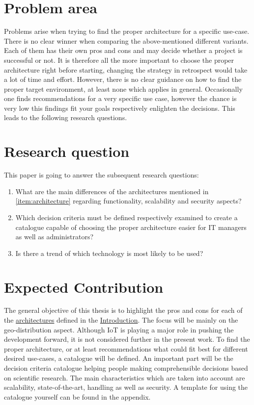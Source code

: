 \documentclass[MIC,Master,english]{twbook}%
\begin{document}
\section{Problem area}
Problems arise when trying to find the proper architecture for a specific use-case. There is no clear winner when comparing the above-mentioned different variants. Each of them has their own pros and cons and may decide whether a project is successful or not. It is therefore all the more important to choose the proper architecture right before starting, changing the strategy in retrospect would take a lot of time and effort. However, there is no clear guidance on how to find the proper target environment, at least none which applies in general. Occasionally one finds recommendations for a very specific use case, however the chance is very low this findings fit your goals respectively enlighten the decisions. This leads to the following research questions.

\section{Research question}
\label{sec:rq}
This paper is going to answer the subsequent research questions:
\begin{enumerate}
    \item What are the main differences of the architectures mentioned in \autoref{item:architecture} regarding functionality, scalability and security aspects?
    \item Which decision criteria must be defined respectively examined to create a catalogue capable
    of choosing the proper architecture easier for \ac{IT} managers as well as administrators?
    \item Is there a trend of which technology is most likely to be used?
\end{enumerate}

\section{Expected Contribution}
\label{sec:goal}
The general objective of this thesis is to highlight the pros and cons for each of the \hyperref[item:architecture]{architectures} defined in the \hyperref[chap:introduction]{Introduction}. The focus will be mainly on the geo-distribution aspect. Although \ac{IoT} is playing a major role in pushing the development forward, it is not considered further in the present work. To find the proper architecture, or at least recommendations what could fit best for different desired use-cases, a catalogue will be defined. An important part will be the decision criteria catalogue helping people making comprehensible decisions based on scientific research. The main characteristics which are taken into account are scalability, state-of-the-art, handling as well as security. A template for using the catalogue yourself can be found in the appendix.
\end{document}

